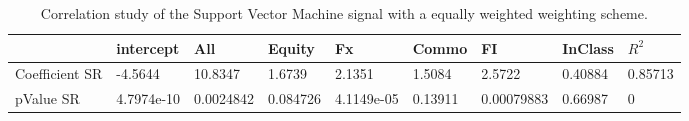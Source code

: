 \begin{table}[H]
\centering
\begin{tabular}{lllllllll}
\hline& intercept & All & Equity & Fx & Commo & FI & InClass & $R^{2}$ \\ 
\hline 
Coefficient SR & -4.5644 & 10.8347 & 1.6739 & 2.1351 & 1.5084 & 2.5722 & 0.40884 & 0.85713 \\ 
pValue SR & 4.7974e-10 & 0.0024842 & 0.084726 & 4.1149e-05 & 0.13911 & 0.00079883 & 0.66987 & 0 \\ 
\hline
\end{tabular}
\caption{Correlation study of the Support Vector Machine signal with a equally weighted weighting scheme.}
\label{SVM_EW_CORR}
\end{table}